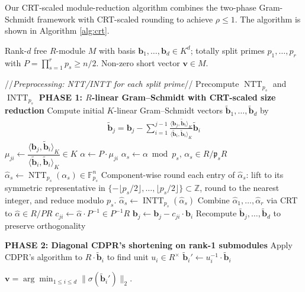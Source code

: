 \documentclass[11pt,a4paper]{article}
\theoremstyle{plain}
\theoremstyle{definition}
\theoremstyle{remark}
\newcommand{\Z}{\mathbb{Z}}
\newcommand{\fp}{\mathfrak{p}}
\begin{document}
Our CRT-scaled module-reduction algorithm combines the two-phase Gram-Schmidt framework with CRT-scaled rounding to achieve $\rho \le 1$. The algorithm is shown in Algorithm \ref{alg:crt}.

\begin{algorithm}[H]
\caption{CRT-Scaled Module Reduction}\label{alg:crt}
\begin{algorithmic}[1]
\Require Rank-$d$ free $R$-module $M$ with basis $\mathbf{b}_1, \dots, \mathbf{b}_d\in K^d$;
         totally split primes $p_1,\dots,p_r$ with $P=\prod_{s=1}^r p_s \ge n/2$.
\Ensure Non-zero short vector $\mathbf{v}\in M$.
\medskip
\medskip

\Statex //\textsl{Preprocessing: NTT/INTT for each split prime}//
    \State Precompute $\operatorname{NTT}_{p_s}$ and $\operatorname{INTT}_{p_s}$
\EndFor
\medskip
\medskip
\Statex \textbf{PHASE 1: $R$-linear Gram–Schmidt with CRT-scaled size reduction}
\State Compute initial $K$-linear Gram–Schmidt vectors
    $\tilde{\mathbf{b}}_1,\dots,\tilde{\mathbf{b}}_d$ by
    \begin{align}
    \tilde{\mathbf{b}}_j=\mathbf{b}_j-\sum_{i=1}^{j-1}
    \frac{\langle \mathbf{b}_j, \tilde{\mathbf{b}}_i \rangle_K}{\langle \tilde{\mathbf{b}}_i, \tilde{\mathbf{b}}_i \rangle_K}\tilde{\mathbf{b}}_i
    \end{align}
        \State $\mu_{ji} \gets \dfrac{\langle \mathbf{b}_j, \tilde{\mathbf{b}}_i \rangle_K}{\langle \tilde{\mathbf{b}}_i, \tilde{\mathbf{b}}_i \rangle_K} \in K$
        \State $\alpha \gets P\cdot \mu_{ji}$
            \State $\alpha_s \gets \alpha \bmod p_s$, $\alpha_s\in R/\fp_s R$
            \State $\hat{\alpha}_s \gets \operatorname{NTT}_{p_s}(\alpha_s) \in \mathbb{F}_{p_s}^n$
           \State Component-wise round each entry of $\hat\alpha_s$: lift to its symmetric representative in $\{-\lfloor p_s/2\rfloor, \dots, \lfloor p_s/2\rfloor\}\subset\Z$, round to the nearest integer, and reduce modulo $p_s$.
            \State $\hat{\alpha}_s \gets \operatorname{INTT}_{p_s}(\hat{\alpha}_s)$
        \EndFor
        \State Combine $\hat{\alpha}_1, \dots, \hat{\alpha}_r$ via CRT to $\hat{\alpha}\in R/PR$
        \State $c_{ji} \gets \hat{\alpha} \cdot P^{-1} \in P^{-1}R$
        \State $\mathbf{b}_j \gets \mathbf{b}_j-c_{ji}\cdot \mathbf{b}_i$
        \State Recompute $\tilde{\mathbf{b}}_j, \dots, \tilde{\mathbf{b}}_d$ to preserve orthogonality
    \EndFor
\EndFor

\medskip
\medskip
\Statex \textbf{PHASE 2: Diagonal CDPR's shortening on rank-1 submodules}
    \State Apply CDPR's algorithm to $R\cdot \tilde{\mathbf{b}}_i$ to find unit $u_i\in R^\times$
    \State $\tilde{\mathbf{b}}_i' \gets u_i^{-1}\cdot \tilde{\mathbf{b}}_i$
\EndFor

\State \Return $\mathbf{v}=\arg\min_{1\le i\le d}\|\sigma(\tilde{\mathbf{b}}_i')\|_2$.
\end{algorithmic}
\end{algorithm}
\end{document}
